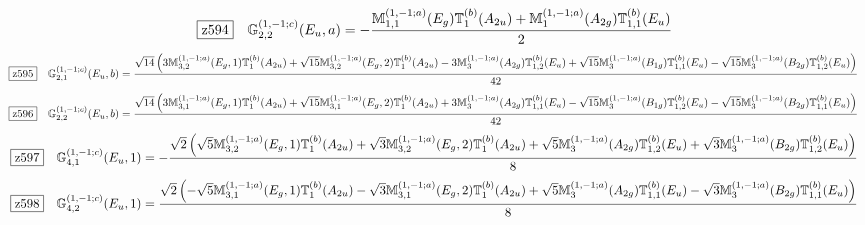 \documentclass[fleqn,10pt,landscape]{jsarticle}
\begin{document}
\begin{dmath*}
\hspace*{3mm}\fbox{z594}\quad \mathbb{G}_{2,2}^{(1,-1;c)}(E_{u},a)=- \frac{\mathbb{M}_{1,1}^{(1,-1;a)}(E_{g}) \mathbb{T}_{1}^{(b)}(A_{2u}) + \mathbb{M}_{1}^{(1,-1;a)}(A_{2g}) \mathbb{T}_{1,1}^{(b)}(E_{u})}{2}
\end{dmath*}
\begin{dmath*}
\hspace*{3mm}\fbox{z595}\quad \mathbb{G}_{2,1}^{(1,-1;c)}(E_{u},b)=\frac{\sqrt{14} \left(3 \mathbb{M}_{3,2}^{(1,-1;a)}(E_{g},1) \mathbb{T}_{1}^{(b)}(A_{2u}) + \sqrt{15} \mathbb{M}_{3,2}^{(1,-1;a)}(E_{g},2) \mathbb{T}_{1}^{(b)}(A_{2u}) - 3 \mathbb{M}_{3}^{(1,-1;a)}(A_{2g}) \mathbb{T}_{1,2}^{(b)}(E_{u}) + \sqrt{15} \mathbb{M}_{3}^{(1,-1;a)}(B_{1g}) \mathbb{T}_{1,1}^{(b)}(E_{u}) - \sqrt{15} \mathbb{M}_{3}^{(1,-1;a)}(B_{2g}) \mathbb{T}_{1,2}^{(b)}(E_{u})\right)}{42}
\end{dmath*}
\begin{dmath*}
\hspace*{3mm}\fbox{z596}\quad \mathbb{G}_{2,2}^{(1,-1;c)}(E_{u},b)=\frac{\sqrt{14} \left(3 \mathbb{M}_{3,1}^{(1,-1;a)}(E_{g},1) \mathbb{T}_{1}^{(b)}(A_{2u}) + \sqrt{15} \mathbb{M}_{3,1}^{(1,-1;a)}(E_{g},2) \mathbb{T}_{1}^{(b)}(A_{2u}) + 3 \mathbb{M}_{3}^{(1,-1;a)}(A_{2g}) \mathbb{T}_{1,1}^{(b)}(E_{u}) - \sqrt{15} \mathbb{M}_{3}^{(1,-1;a)}(B_{1g}) \mathbb{T}_{1,2}^{(b)}(E_{u}) - \sqrt{15} \mathbb{M}_{3}^{(1,-1;a)}(B_{2g}) \mathbb{T}_{1,1}^{(b)}(E_{u})\right)}{42}
\end{dmath*}
\begin{dmath*}
\hspace*{3mm}\fbox{z597}\quad \mathbb{G}_{4,1}^{(1,-1;c)}(E_{u},1)=- \frac{\sqrt{2} \left(\sqrt{5} \mathbb{M}_{3,2}^{(1,-1;a)}(E_{g},1) \mathbb{T}_{1}^{(b)}(A_{2u}) + \sqrt{3} \mathbb{M}_{3,2}^{(1,-1;a)}(E_{g},2) \mathbb{T}_{1}^{(b)}(A_{2u}) + \sqrt{5} \mathbb{M}_{3}^{(1,-1;a)}(A_{2g}) \mathbb{T}_{1,2}^{(b)}(E_{u}) + \sqrt{3} \mathbb{M}_{3}^{(1,-1;a)}(B_{2g}) \mathbb{T}_{1,2}^{(b)}(E_{u})\right)}{8}
\end{dmath*}
\begin{dmath*}
\hspace*{3mm}\fbox{z598}\quad \mathbb{G}_{4,2}^{(1,-1;c)}(E_{u},1)=\frac{\sqrt{2} \left(- \sqrt{5} \mathbb{M}_{3,1}^{(1,-1;a)}(E_{g},1) \mathbb{T}_{1}^{(b)}(A_{2u}) - \sqrt{3} \mathbb{M}_{3,1}^{(1,-1;a)}(E_{g},2) \mathbb{T}_{1}^{(b)}(A_{2u}) + \sqrt{5} \mathbb{M}_{3}^{(1,-1;a)}(A_{2g}) \mathbb{T}_{1,1}^{(b)}(E_{u}) - \sqrt{3} \mathbb{M}_{3}^{(1,-1;a)}(B_{2g}) \mathbb{T}_{1,1}^{(b)}(E_{u})\right)}{8}
\end{dmath*}
\end{document}
